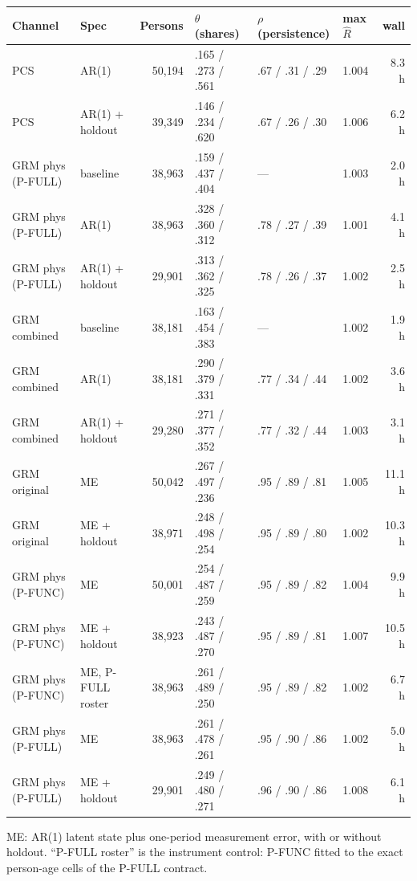 \documentclass[11pt]{article}
\begin{document}
\begin{center}\footnotesize\setlength{\tabcolsep}{4pt}
\begin{tabular}{llrlllr}
\toprule
Channel & Spec & Persons & $\theta$ (shares) & $\rho$ (persistence) &
max $\hat R$ & wall \\
\midrule
PCS & AR(1) & 50{,}194 & .165 / .273 / .561 & .67 / .31 / .29 & 1.004 & 8.3 h \\
PCS & AR(1) + holdout & 39{,}349 & .146 / .234 / .620 & .67 / .26 / .30 & 1.006 & 6.2 h \\
GRM phys (P-FULL) & baseline & 38{,}963 & .159 / .437 / .404 & --- & 1.003 & 2.0 h \\
GRM phys (P-FULL) & AR(1) & 38{,}963 & .328 / .360 / .312 & .78 / .27 / .39 & 1.001 & 4.1 h \\
GRM phys (P-FULL) & AR(1) + holdout & 29{,}901 & .313 / .362 / .325 & .78 / .26 / .37 & 1.002 & 2.5 h \\
GRM combined & baseline & 38{,}181 & .163 / .454 / .383 & --- & 1.002 & 1.9 h \\
GRM combined & AR(1) & 38{,}181 & .290 / .379 / .331 & .77 / .34 / .44 & 1.002 & 3.6 h \\
GRM combined & AR(1) + holdout & 29{,}280 & .271 / .377 / .352 & .77 / .32 / .44 & 1.003 & 3.1 h \\
\addlinespace
GRM original & ME & 50{,}042 & .267 / .497 / .236 & .95 / .89 / .81 & 1.005 & 11.1 h \\
GRM original & ME + holdout & 38{,}971 & .248 / .498 / .254 & .95 / .89 / .80 & 1.002 & 10.3 h \\
GRM phys (P-FUNC) & ME & 50{,}001 & .254 / .487 / .259 & .95 / .89 / .82 & 1.004 & 9.9 h \\
GRM phys (P-FUNC) & ME + holdout & 38{,}923 & .243 / .487 / .270 & .95 / .89 / .81 & 1.007 & 10.5 h \\
GRM phys (P-FUNC) & ME, P-FULL roster & 38{,}963 & .261 / .489 / .250 & .95 / .89 / .82 & 1.002 & 6.7 h \\
GRM phys (P-FULL) & ME & 38{,}963 & .261 / .478 / .261 & .95 / .90 / .86 & 1.002 & 5.0 h \\
GRM phys (P-FULL) & ME + holdout & 29{,}901 & .249 / .480 / .271 & .96 / .90 / .86 & 1.008 & 6.1 h \\
\bottomrule
\end{tabular}

{\scriptsize ME: AR(1) latent state plus one-period measurement error, with or without holdout. ``P-FULL roster'' is the instrument control: P-FUNC fitted
to the exact person-age cells of the P-FULL contract.}
\end{center}
\end{document}
